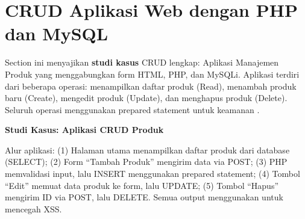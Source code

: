 \section{CRUD Aplikasi Web dengan PHP dan MySQL}

Section ini menyajikan \textbf{studi kasus} CRUD lengkap: Aplikasi Manajemen Produk yang menggabungkan form HTML, PHP, dan MySQLi. Aplikasi terdiri dari beberapa operasi: menampilkan daftar produk (Read), menambah produk baru (Create), mengedit produk (Update), dan menghapus produk (Delete). Seluruh operasi menggunakan prepared statement untuk keamanan \cite{phpManual}.

\begin{contoh}
\textbf{Studi Kasus: Aplikasi CRUD Produk}

Alur aplikasi: (1) Halaman utama menampilkan daftar produk dari database (SELECT); (2) Form ``Tambah Produk'' mengirim data via POST; (3) PHP memvalidasi input, lalu INSERT menggunakan prepared statement; (4) Tombol ``Edit'' memuat data produk ke form, lalu UPDATE; (5) Tombol ``Hapus'' mengirim ID via POST, lalu DELETE. Semua output menggunakan  untuk mencegah XSS.
\end{contoh}

